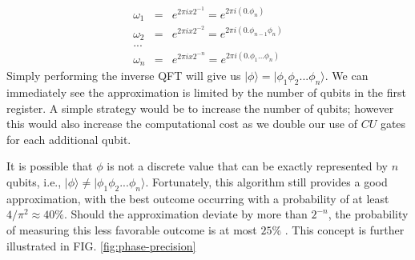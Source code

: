 \documentclass[msc,oneside]{ubcthesis}
\begin{document}
	\begin{eqnarray*}
		\omega_1 &=& e^{2\pi i x 2^{-1}} =  e^{2\pi i (0.\phi_n)}\\
		\omega_2 &=& e^{2\pi i x 2^{-2}} =  e^{2\pi i (0.\phi_{n-1}\phi_n)}\\
		...\\
		\omega_n &=& e^{2\pi i x 2^{-n}} =  e^{2\pi i (0.\phi_1...\phi_n)}
	\end{eqnarray*}
	Simply performing the inverse QFT will give us $|\phi\rangle =  |\phi_1\phi_2 ... \phi_n\rangle$.  We can immediately see the approximation is limited by the number of qubits in the first register. A simple strategy would be to increase the number of qubits; however this would also increase the computational cost as we double our use of $CU$ gates for each additional qubit.
	
	It is possible that $\phi$ is not a discrete value that can be exactly represented by $n$ qubits, i.e., $|\phi\rangle \neq |\phi_1\phi_2 ... \phi_n\rangle$. Fortunately, this algorithm still provides a good approximation, with the best outcome occurring with a probability of at least $4/{\pi^2} \approx 40\%$. Should the approximation deviate by more than $2^{-n}$, the probability of measuring this less favorable outcome is at most $25\%$ \cite{Phase-estimation}. This concept is further illustrated in FIG. \ref{fig:phase-precision}
	
\end{document}
